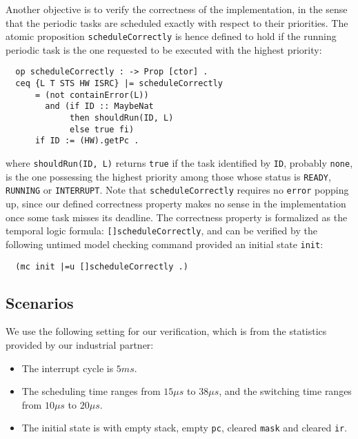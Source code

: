 \documentclass[10pt,journal,compsoc]{IEEEtran}
\newcommand{\hide}[1]{\ignorespaces}
\begin{document}
Another objective is to verify the correctness of the implementation,
in the sense that the periodic tasks are scheduled exactly with
respect to their priorities. The atomic proposition
\verb|scheduleCorrectly| is hence defined to hold if the running
periodic task is the one requested to be executed with the highest
priority:
\begin{verbatim}
  op scheduleCorrectly : -> Prop [ctor] .
  ceq {L T STS HW ISRC} |= scheduleCorrectly 
      = (not containError(L))
        and (if ID :: MaybeNat 
             then shouldRun(ID, L)
             else true fi)
      if ID := (HW).getPc .
\end{verbatim}
where \verb|shouldRun(ID, L)| returns \verb|true| if the task
identified by \verb|ID|, probably \verb|none|, is the one possessing
the highest priority among those whose status is \verb|READY|,
\verb|RUNNING| or \verb|INTERRUPT|. Note that \verb|scheduleCorrectly|
requires no \verb|error| popping up, since our defined correctness
property makes no sense in the implementation once some task misses
its deadline. The correctness property is formalized as the temporal
logic formula: \verb|[]scheduleCorrectly|, and can be verified by the
following untimed model checking command provided an initial state
\verb|init|:
\begin{verbatim}
  (mc init |=u []scheduleCorrectly .)
\end{verbatim}

\subsection{Scenarios}
\label{ss:results}
We use the following setting for our verification, which is from the 
statistics provided by our industrial partner:
\begin{itemize}
\item The interrupt cycle is $5ms$.
\item The scheduling time ranges from $15{\mu}s$ to $38{\mu}s$, and the
switching time ranges from $10{\mu}s$ to $20{\mu}s$.
\hide{\item The scheduling time ranges from $5{\mu}s$ to $9{\mu}s$, and the
switching time ranges from $2{\mu}s$ to $4{\mu}s$.}
\item The initial state is with empty stack, empty \verb|pc|, cleared 
\verb|mask| and cleared \verb|ir|.
\end{itemize}
\end{document}
